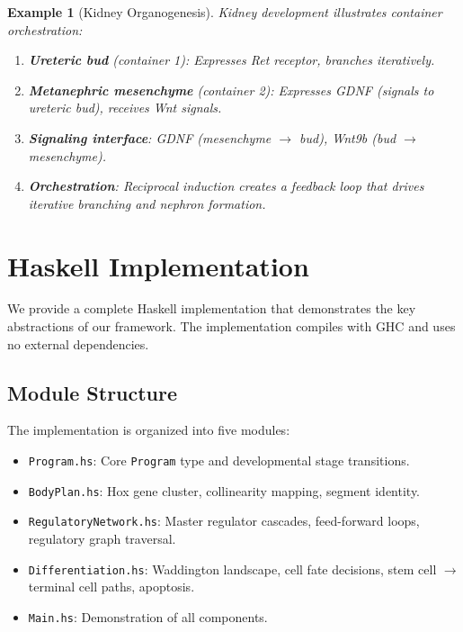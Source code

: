 \documentclass[12pt,a4paper]{article}
\newtheorem{example}[theorem]{Example}
\begin{document}
\begin{example}[Kidney Organogenesis]
Kidney development illustrates container orchestration:
\begin{enumerate}
  \item \textbf{Ureteric bud} (container 1): Expresses Ret receptor,
    branches iteratively.
  \item \textbf{Metanephric mesenchyme} (container 2): Expresses GDNF
    (signals to ureteric bud), receives Wnt signals.
  \item \textbf{Signaling interface}: GDNF (mesenchyme $\to$ bud),
    Wnt9b (bud $\to$ mesenchyme).
  \item \textbf{Orchestration}: Reciprocal induction creates a
    feedback loop that drives iterative branching and nephron formation.
\end{enumerate}
\end{example}


\section{Haskell Implementation}\label{sec:implementation}

We provide a complete Haskell implementation that demonstrates the
key abstractions of our framework.  The implementation compiles with
GHC and uses no external dependencies.

\subsection{Module Structure}

The implementation is organized into five modules:

\begin{itemize}[leftmargin=2em]
  \item \texttt{Program.hs}: Core \texttt{Program} type and
    developmental stage transitions.
  \item \texttt{BodyPlan.hs}: Hox gene cluster, collinearity
    mapping, segment identity.
  \item \texttt{RegulatoryNetwork.hs}: Master regulator cascades,
    feed-forward loops, regulatory graph traversal.
  \item \texttt{Differentiation.hs}: Waddington landscape, cell
    fate decisions, stem cell $\to$ terminal cell paths, apoptosis.
  \item \texttt{Main.hs}: Demonstration of all components.
\end{itemize}
\end{document}
